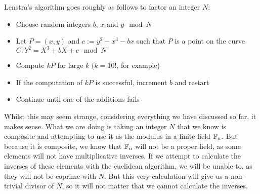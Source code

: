 \begin{definition}
	Lenstra's algorithm goes roughly as follows to factor an integer $N$:
	\begin{itemize}
		\item Choose random integers $b$, $x$ and $y \mod N$
		\item Let $P = (x,y)$ and $c:=y^2-x^3-bx$ such that $P$ is a point on the curve $C: Y^2 = X^3 +bX + c \mod N$
		\item Compute $kP$ for large $k$ ($k=10!$, for example)
		\item If the computation of $kP$ is successful, increment $b$ and restart
		\item Continue until one of the additions fails
	\end{itemize}
\end{definition}
Whilst this may seem strange, considering everything we have discussed so far, it makes sense. What we are doing is taking an integer $N$ that we know is composite and attempting to use it as the modulus in a finite field $\fp[n]$. But because it is composite, we know that $\fp[n]$ will not be a proper field, as some elements will not have multiplicative inverses. If we attempt to calculate the inverses of these elements with the euclidean algorithm, we will be unable to, as they will not be coprime with $N$. But this very calculation will give us a non-trivial divisor of $N$, so it will not matter that we cannot calculate the inverses.
